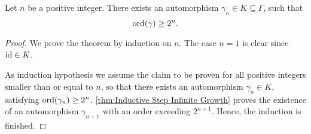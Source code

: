 \begin{thm}\label{thm:infinite growth}
Let $n$ be a positive integer. There exists an automorphism $\gamma_{n}\in K\subseteq\Gamma$, such that
\begin{equation*}
\operatorname{\mathrm{ord}}(\gamma)\geq 2^n.
\end{equation*}
\end{thm}

\begin{proof}
We prove the theorem by induction on $n$. The case $n=1$ is clear since $\operatorname{id}\in K$.

As induction hypothesis we assume the claim to be proven for all positive integers smaller than or equal to $n$, so that there exists an automorphism $\gamma_n\in K$, satisfying $\operatorname{\mathrm{ord}}(\gamma_n)\geq 2^n$. \cref{thm:Inductive Step Infinite Growth} proves the existence of an automorphism $\gamma_{n+1}$ with an order exceeding $2^{n+1}$. Hence, the induction is finished.
\end{proof}
